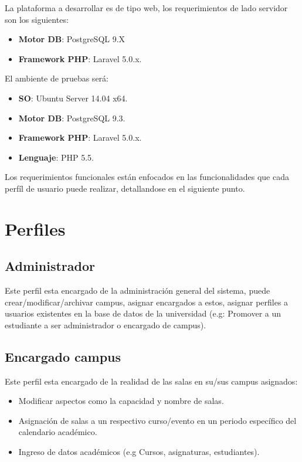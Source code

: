 \documentclass[a4paper,10pt]{article}
\begin{document}
La plataforma a desarrollar es de tipo web, los requerimientos de lado servidor son los siguientes:

\begin{itemize}
 \item {\bf Motor DB}: PostgreSQL 9.X
 \item {\bf Framework PHP}: Laravel 5.0.x.
\end{itemize}

El ambiente de pruebas será:

\begin{itemize}
 \item {\bf SO}: Ubuntu Server 14.04 x64.
 \item {\bf Motor DB}: PostgreSQL 9.3.
 \item {\bf Framework PHP}: Laravel 5.0.x.
 \item {\bf Lenguaje}: PHP 5.5.
\end{itemize}

Los requerimientos funcionales están enfocados en las funcionalidades que cada perfíl de usuario puede realizar, detallandose en el siguiente punto.

\section{Perfiles}
\subsection{Administrador}

Este perfil esta encargado de la administración general del sistema, puede crear/modificar/archivar campus, asignar encargados a estos, asignar perfiles a usuarios existentes en la base de datos de la universidad (e.g: Promover a un estudiante a ser administrador o encargado de campus).

\subsection{Encargado campus}

Este perfil esta encargado de la realidad de las salas en su/sus campus asignados:

\begin{itemize}
 \item Modificar aspectos como la capacidad y nombre de salas.
 \item Asignación de salas a un respectivo curso/evento en un periodo específico del calendario académico.
 \item Ingreso de datos académicos (e.g Cursos, asignaturas, estudiantes).
\end{itemize}
\end{document}
